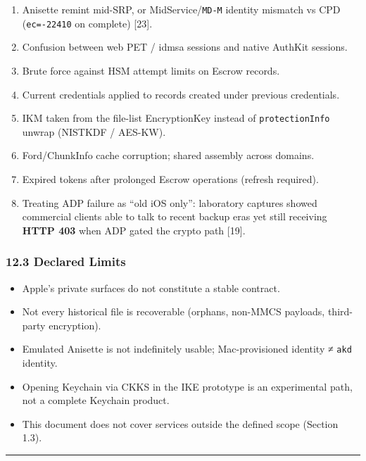 \documentclass[
  english,
  10pt]{article}
\providecommand{\tightlist}{%
  \setlength{\itemsep}{0pt}\setlength{\parskip}{0pt}}
\begin{document}
\begin{enumerate}
\def\labelenumi{\arabic{enumi}.}
\tightlist
\item
  Anisette remint mid-SRP, or MidService/\texttt{MD-M} identity mismatch
  vs CPD (\texttt{ec=-22410} on complete) {[}23{]}.
\item
  Confusion between web PET / idmsa sessions and native AuthKit
  sessions.
\item
  Brute force against HSM attempt limits on Escrow records.
\item
  Current credentials applied to records created under previous
  credentials.
\item
  IKM taken from the file-list EncryptionKey instead of
  \texttt{protectionInfo} unwrap (NISTKDF / AES-KW).
\item
  Ford/ChunkInfo cache corruption; shared assembly across domains.
\item
  Expired tokens after prolonged Escrow operations (refresh required).
\item
  Treating ADP failure as ``old iOS only'': laboratory captures showed
  commercial clients able to talk to recent backup eras yet still
  receiving \textbf{HTTP 403} when ADP gated the crypto path {[}19{]}.
\end{enumerate}

\subsubsection{12.3 Declared Limits}\label{declared-limits}

\begin{itemize}
\tightlist
\item
  Apple's private surfaces do not constitute a stable contract.
\item
  Not every historical file is recoverable (orphans, non-MMCS payloads,
  third-party encryption).
\item
  Emulated Anisette is not indefinitely usable; Mac-provisioned identity
  ≠ \texttt{akd} identity.
\item
  Opening Keychain via CKKS in the IKE prototype is an experimental
  path, not a complete Keychain product.
\item
  This document does not cover services outside the defined scope
  (Section 1.3).
\end{itemize}

\begin{center}\rule{0.5\linewidth}{0.5pt}\end{center}
\end{document}
